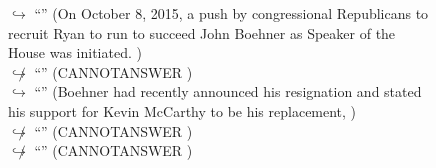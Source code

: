 \documentclass[11pt,a4paper, onecolumn]{article}
\begin{document}
\begin{figure}[t] \small \begin{tcolorbox}[boxsep=0pt,left=5pt,right=0pt,top=2pt,colback = yellow!5] \begin{dialogue}
 \small 
\colorbox{pink!25}{$\hookrightarrow$}
{ ``'' (On October 8, 2015, a push by congressional Republicans to recruit Ryan to run to succeed John Boehner as Speaker of the House was initiated. ) }
\\
\colorbox{pink!25}{$\not\hookrightarrow$}
{ ``'' (CANNOTANSWER ) }
\\
\colorbox{pink!25}{$\hookrightarrow$}
{ ``'' (Boehner had recently announced his resignation and stated his support for Kevin McCarthy to be his replacement, ) }
\\
\colorbox{pink!25}{$\not\hookrightarrow$}
{ ``'' (CANNOTANSWER ) }
\\
\colorbox{pink!25}{$\not\hookrightarrow$}
{ ``'' (CANNOTANSWER ) }
\\
 \end{dialogue}\end{tcolorbox}\end{figure}
\end{document}

